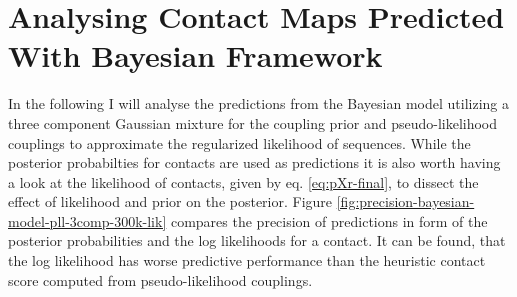 \documentclass[11pt,a4paper,twoside]{book}
\theoremstyle{definition}
\theoremstyle{definition}
\theoremstyle{remark}
\begin{document}
\section{Analysing Contact Maps Predicted With Bayesian
Framework}\label{analysing-contact-maps-predicted-with-bayesian-framework}

In the following I will analyse the predictions from the Bayesian model
utilizing a three component Gaussian mixture for the coupling prior and
pseudo-likelihood couplings to approximate the regularized likelihood of
sequences. While the posterior probabilties for contacts are used as
predictions it is also worth having a look at the likelihood of
contacts, given by eq. \eqref{eq:pXr-final}, to dissect the effect of
likelihood and prior on the posterior. Figure
\ref{fig:precision-bayesian-model-pll-3comp-300k-lik} compares the
precision of predictions in form of the posterior probabilities and the
log likelihoods for a contact. It can be found, that the log likelihood
has worse predictive performance than the heuristic contact score
computed from pseudo-likelihood couplings.
\end{document}
